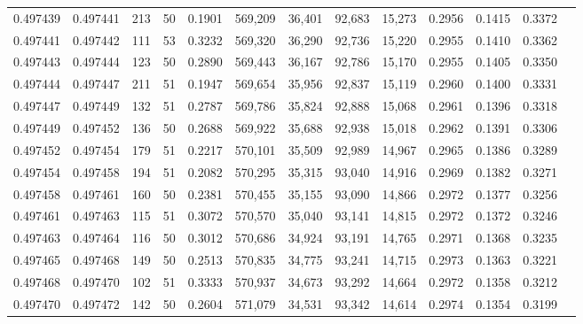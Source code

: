 \begin{tabular}{rrrrrrrrrrrrr}
0.497439 & 0.497441 &   213 &  50 &                                     0.1901 & 569,209 &  36,401 &  92,683 &  15,273 & 0.2956 & 0.1415 & 0.3372 \\
0.497441 & 0.497442 &   111 &  53 &                                     0.3232 & 569,320 &  36,290 &  92,736 &  15,220 & 0.2955 & 0.1410 & 0.3362 \\
0.497443 & 0.497444 &   123 &  50 &                                     0.2890 & 569,443 &  36,167 &  92,786 &  15,170 & 0.2955 & 0.1405 & 0.3350 \\
0.497444 & 0.497447 &   211 &  51 &                                     0.1947 & 569,654 &  35,956 &  92,837 &  15,119 & 0.2960 & 0.1400 & 0.3331 \\
0.497447 & 0.497449 &   132 &  51 &                                     0.2787 & 569,786 &  35,824 &  92,888 &  15,068 & 0.2961 & 0.1396 & 0.3318 \\
0.497449 & 0.497452 &   136 &  50 &                                     0.2688 & 569,922 &  35,688 &  92,938 &  15,018 & 0.2962 & 0.1391 & 0.3306 \\
0.497452 & 0.497454 &   179 &  51 &                                     0.2217 & 570,101 &  35,509 &  92,989 &  14,967 & 0.2965 & 0.1386 & 0.3289 \\
0.497454 & 0.497458 &   194 &  51 &                                     0.2082 & 570,295 &  35,315 &  93,040 &  14,916 & 0.2969 & 0.1382 & 0.3271 \\
0.497458 & 0.497461 &   160 &  50 &                                     0.2381 & 570,455 &  35,155 &  93,090 &  14,866 & 0.2972 & 0.1377 & 0.3256 \\
0.497461 & 0.497463 &   115 &  51 &                                     0.3072 & 570,570 &  35,040 &  93,141 &  14,815 & 0.2972 & 0.1372 & 0.3246 \\
0.497463 & 0.497464 &   116 &  50 &                                     0.3012 & 570,686 &  34,924 &  93,191 &  14,765 & 0.2971 & 0.1368 & 0.3235 \\
0.497465 & 0.497468 &   149 &  50 &                                     0.2513 & 570,835 &  34,775 &  93,241 &  14,715 & 0.2973 & 0.1363 & 0.3221 \\
0.497468 & 0.497470 &   102 &  51 &                                     0.3333 & 570,937 &  34,673 &  93,292 &  14,664 & 0.2972 & 0.1358 & 0.3212 \\
0.497470 & 0.497472 &   142 &  50 &                                     0.2604 & 571,079 &  34,531 &  93,342 &  14,614 & 0.2974 & 0.1354 & 0.3199 \\

\end{tabular}
